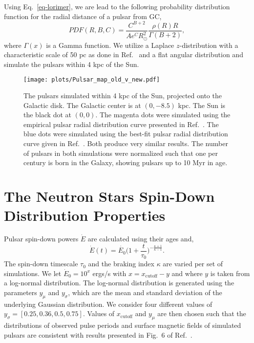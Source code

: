 \documentclass[aps,prd,twocolumn,amsmath,superscriptaddress,amssymb,showpacs,floatfix,nofootinbib]{revtex4-1}
\begin{document}
\begin{appendix}
Using Eq.~\eqref{eq-lorimer}, we are lead to the following
probability distribution function for the radial distance of a
pulsar from GC,
\begin{equation}
	PDF(R, B, C) = 
	\frac{C^{B+2}}{A e^C R_{\odot}^2}
	\frac{ \rho(R) R }{ \Gamma (B+2) },
\end{equation}
where $\Gamma(x)$ is a Gamma function. 
We utilize a Laplace $z$-distribution with a characteristic
scale of 50 pc as done in Ref.~\cite{FaucherGiguere:2005ny} and
a flat angular distribution and simulate the pulsars within 4
kpc of the Sun. 
\begin{figure}
\begin{centering}
\texttt{[image: plots/Pulsar\_map\_old\_v\_new.pdf]}
\caption{The pulsars simulated within 4 kpc of the Sun,
projected onto the Galactic disk. The Galactic center is at $(0,
-8.5)$ kpc. The Sun is the black dot at $(0,0)$. The magenta
dots were simulated using the empirical pulsar radial
distribution curve presented in Ref.~\cite{Lorimer:2003qc}. The blue
dots were simulated using the best-fit pulsar radial
distribution curve given in Ref.~\cite{Lorimer:2006qs}. Both produce
very similar results. The number of pulsars in both simulations
were normalized such that  one per century is born in the Galaxy,
showing pulsars up to 10 Myr in age.}
\end{centering}
\label{fig:sim_psr_map_old_v_new}
\end{figure}

\section{The Neutron Stars Spin-Down Distribution Properties}
\label{appB}

Pulsar spin-down powers $\dot{E}$ are calculated using their ages and,
\begin{equation}
\dot{E}(t) = \dot{E_{0}}  \bigg(1 + \frac{t}{\tau_{0}}  \bigg)^{-\frac{\kappa+1}{\kappa-1}}.
\label{eq:SpinDown}
\end{equation}
The spin-down timescale $\tau_0$ and the braking index $\kappa$ are varied per set of simulations. 
We let $\dot{E}_0 = 10^x$ ergs/s with $x =
x_{\textrm{cutoff}} - y$ and where $y$ is taken from a
log-normal distribution. 
The log-normal distribution is generated using the parameters
$y_{\mu}$ and $y_{\sigma}$, which are the mean and
standard deviation of the underlying Gaussian distribution. We
consider four different values of $y_{\sigma} = [0.25,
0.36, 0.5, 0.75]$. Values of $x_{\textrm{cutoff}}$ and
$y_{\mu}$ are then chosen such that the distributions of
observed pulse periods and surface magnetic fields of simulated
pulsars are consistent with results presented in Fig.\ 6 of
Ref.~\cite{FaucherGiguere:2005ny}. 


\end{appendix}
\end{document}
